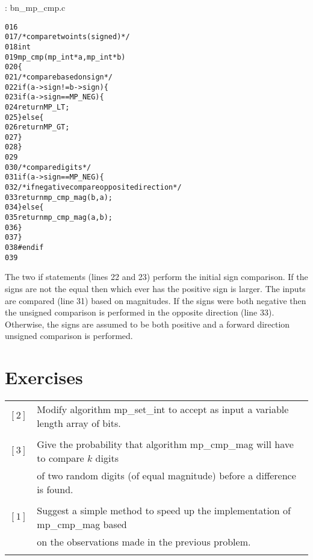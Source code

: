 \documentclass[b5paper]{book}
\begin{document}
\vspace{+3mm}\begin{small}
\hspace{-5.1mm}{\bf File}: bn\_mp\_cmp.c
\vspace{-3mm}
\begin{alltt}
016   
017   /* compare two ints (signed)*/
018   int
019   mp_cmp (mp_int * a, mp_int * b)
020   \{
021     /* compare based on sign */
022     if (a->sign != b->sign) \{
023        if (a->sign == MP_NEG) \{
024           return MP_LT;
025        \} else \{
026           return MP_GT;
027        \}
028     \}
029     
030     /* compare digits */
031     if (a->sign == MP_NEG) \{
032        /* if negative compare opposite direction */
033        return mp_cmp_mag(b, a);
034     \} else \{
035        return mp_cmp_mag(a, b);
036     \}
037   \}
038   #endif
039   
\end{alltt}
\end{small}

The two if statements (lines 22 and 23) perform the initial sign comparison.  If the signs are not the equal then which ever
has the positive sign is larger.   The inputs are compared (line 31) based on magnitudes.  If the signs were both 
negative then the unsigned comparison is performed in the opposite direction (line 33).  Otherwise, the signs are assumed to 
be both positive and a forward direction unsigned comparison is performed.

\section*{Exercises}
\begin{tabular}{cl}
$\left [ 2 \right ]$ & Modify algorithm mp\_set\_int to accept as input a variable length array of bits. \\
                     & \\
$\left [ 3 \right ]$ & Give the probability that algorithm mp\_cmp\_mag will have to compare $k$ digits  \\
                     & of two random digits (of equal magnitude) before a difference is found. \\
                     & \\
$\left [ 1 \right ]$ & Suggest a simple method to speed up the implementation of mp\_cmp\_mag based  \\
                     & on the observations made in the previous problem. \\
                     &
\end{tabular}
\end{document}

